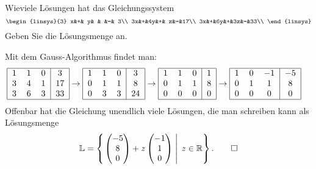 Wieviele Lösungen hat das Gleichungssystem
\[
\begin{linsys}{3}
 x&+& y& &  &=& 3\\
3x&+&4y&+& z&=&17\\
3x&+&6y&+&3z&=&33\\
\end{linsys}
\]
Geben Sie die Lösungsmenge an.


\begin{loesung}
Mit dem Gauss-Algorithmus findet man:
\begin{align*}
\begin{tabular}{|ccc|c|}
\hline
1&1&0& 3\\
3&4&1&17\\
3&6&3&33\\
\hline
\end{tabular}
&\rightarrow
\begin{tabular}{|ccc|c|}
\hline
1&1&0& 3\\
0&1&1& 8\\
0&3&3&24\\
\hline
\end{tabular}
\rightarrow
\begin{tabular}{|ccc|c|}
\hline
1&1&0&1\\
0&1&1&8\\
0&0&0&0\\
\hline
\end{tabular}
\rightarrow
\begin{tabular}{|ccc|c|}
\hline
1&0&$-1$&$-5$\\
0&1&1&8\\
0&0&0&0\\
\hline
\end{tabular}
\end{align*}
Offenbar hat die Gleichung unendlich viele Lösungen,
die man schreiben kann als
Lösungsmenge
\[
\mathbb L=
\left\{
\left.
\begin{pmatrix}-5\\8\\0\end{pmatrix}+z\begin{pmatrix}-1\\1\\0\end{pmatrix}\;\right|\;z\in\mathbb R
\right\}.
\qedhere
\]
\end{loesung}

